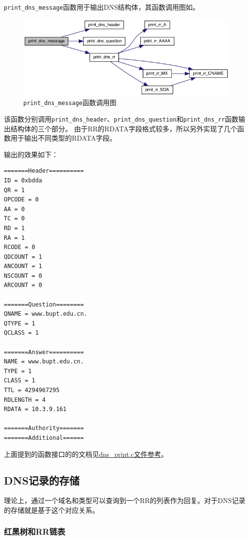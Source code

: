 \documentclass[lang=cn,11pt,a4paper,cite=authornum]{paper}
\begin{document}
\texttt{print_dns_message}函数用于输出DNS结构体，其函数调用图如。

\begin{figure}[htbp]

    \centering
    \includegraphics[width=0.7\linewidth]{./APIdoc/dns__print_8c_a33a39397e0f2e1a98b86b6d85321ee79_cgraph.png}
    \caption{\texttt{print_dns_message}函数调用图\label{fig:print_dns_message_call}}

\end{figure}

该函数分别调用\texttt{print_dns_header}、\texttt{print_dns_question}和\texttt{print_dns_rr}函数输出结构体的三个部分。
由于RR的RDATA字段格式较多，所以另外实现了几个函数用于输出不同类型的RDATA字段。

输出的效果如下：

\begin{code}
\begin{verbatim}
=======Header==========
ID = 0xbdda
QR = 1
OPCODE = 0
AA = 0
TC = 0
RD = 1
RA = 1
RCODE = 0
QDCOUNT = 1
ANCOUNT = 1
NSCOUNT = 0
ARCOUNT = 0

=======Question========
QNAME = www.bupt.edu.cn.
QTYPE = 1
QCLASS = 1

=======Answer==========
NAME = www.bupt.edu.cn.
TYPE = 1
CLASS = 1
TTL = 4294967295
RDLENGTH = 4
RDATA = 10.3.9.161

=======Authority=======
=======Additional======
\end{verbatim}
\end{code}

上面提到的函数接口的的文档见\href{run:./APIdoc/dns__print_8c.html}{dns\_print.c文件参考}。

\subsection{DNS记录的存储}

理论上，通过一个域名和类型可以查询到一个RR的列表作为回复。对于DNS记录的存储就是基于这个对应关系。

\subsubsection{红黑树和RR链表}
\end{document}
